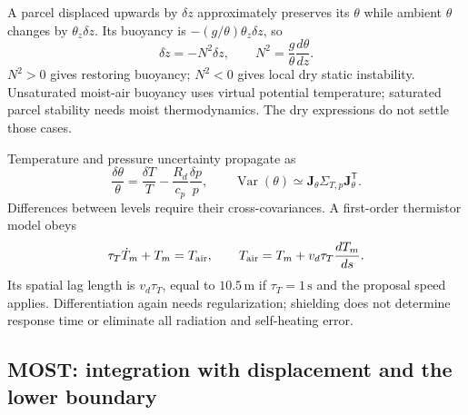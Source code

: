 \documentclass[11pt,a4paper]{article}
\numberwithin{equation}{section}
\begin{document}
A parcel displaced upwards by $\delta z$ approximately preserves its
$\theta$ while ambient $\theta$ changes by $\theta_z\delta z$.
Its buoyancy is $-(g/\theta)\theta_z\delta z$, so
\begin{equation}
 \delta\ddot z=-N^2\delta z,\qquad
 N^2=\frac{g}{\theta}\frac{d\theta}{dz}.
\end{equation}
$N^2>0$ gives restoring buoyancy; $N^2<0$ gives local dry static
instability. Unsaturated moist-air buoyancy uses virtual potential
temperature; saturated parcel stability needs moist thermodynamics.
The dry expressions do not settle those cases.

Temperature and pressure uncertainty propagate as
\begin{equation}
 \frac{\delta\theta}{\theta}
 =\frac{\delta T}{T}-\frac{R_d}{c_p}\frac{\delta p}{p},
 \qquad \operatorname{Var}(\theta)\simeq
 \boldsymbol J_\theta\Sigma_{T,p}\boldsymbol J_\theta^{\mathsf T}.
\end{equation}
Differences between levels require their cross-covariances. A first-order
thermistor model obeys
\begin{equation}
 \tau_T\dot T_m+T_m=T_{\rm air},\qquad
 T_{\rm air}=T_m+v_d\tau_T\frac{dT_m}{ds}.
\end{equation}
Its spatial lag length is $v_d\tau_T$, equal to $10.5\,\mathrm m$ if
$\tau_T=1\,\mathrm s$ and the proposal speed applies. Differentiation
again needs regularization; shielding does not determine response time or
eliminate all radiation and self-heating error.

\subsection{MOST: integration with displacement and the lower boundary}
\end{document}
